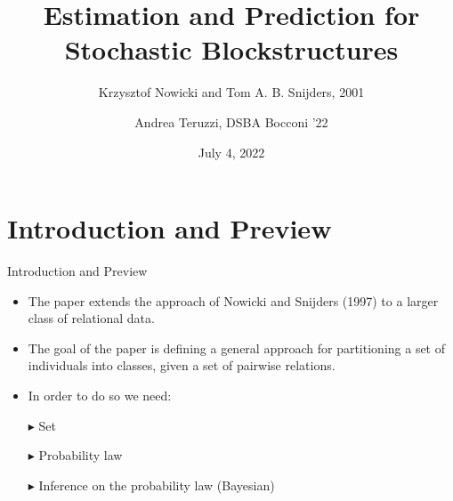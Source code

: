 \documentclass[aspectratio=169,xcolor=dvipsnames]{beamer}
\title[Nowicki and Snijders '01]{Estimation and Prediction for Stochastic Blockstructures} \subtitle{Krzysztof Nowicki and Tom A. B. Snijders, 2001}
\author[Andrea Teruzzi] {Andrea Teruzzi, DSBA Bocconi '22}
\date{July 4, 2022}
\begin{document}
\begin{frame}
    \titlepage
\end{frame}



\section{Introduction and Preview}
\begin{frame}{Introduction and Preview}
\begin{itemize}
    \item The paper extends the approach of Nowicki and Snijders (1997) to a larger class of relational data.
    
    \item The goal of the paper is defining a general approach for partitioning a set of individuals into classes, given a set of pairwise relations.
    
    \item In order to do so we need:
        
        \addtolength{\itemindent}{12pt}
        
        \item[$\blacktriangleright$] Set
        
        \item[$\blacktriangleright$] Probability law
        
        \item[$\blacktriangleright$] Inference on the probability law (Bayesian)
\end{itemize}
\end{frame}

\end{document}
